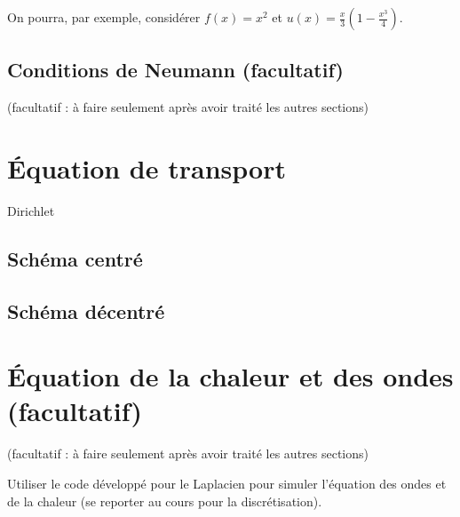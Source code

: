 \documentclass[12pt]{article}
\begin{document}
On pourra, par exemple, consid\'erer $f(x) = x^2$ et $u(x) = \frac{x}{3}(1-\frac{x^3}{4})$.
\subsection{Conditions de Neumann (facultatif)}
(facultatif : \`a faire seulement apr\`es avoir trait\'e les autres sections)

\section{\'Equation de transport}

Dirichlet

\subsection{Sch\'ema centr\'e}

\subsection{Sch\'ema d\'ecentr\'e}

\section{\'Equation de la chaleur et des ondes (facultatif)}
(facultatif : \`a faire seulement apr\`es avoir trait\'e les autres sections)

Utiliser le code d\'evelopp\'e pour le Laplacien pour simuler l'\'equation des ondes
et de la chaleur (se reporter au cours pour la discr\'etisation).
\end{document}
